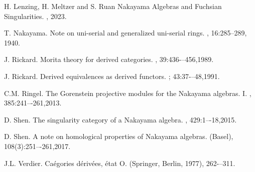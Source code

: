 \documentclass[a4paper, reqno]{amsart}
\theoremstyle{definition}
\theoremstyle{remark}
\numberwithin{equation}{section}
\begin{document}
\begin{thebibliography}{1}
H. Lenzing, H. Meltzer and S. Ruan
\newblock Nakayama Algebras and Fuchsian Singularities.
, 2023.

T. Nakayama.
\newblock Note on uni-serial and generalized uni-serial rings.
, 16:285--289, 1940.

J. Rickard.
\newblock Morita theory for derived categories.
, 39:436-–456,1989.

J. Rickard.
\newblock Derived equivalences as derived functors. ; 43:37-–48,1991.

C.M. Ringel.
\newblock The Gorenstein projective modules for the Nakayama algebras. I.
, 385:241–-261,2013.

D. Shen.
\newblock The singularity category of a Nakayama algebra.
, 429:1–-18,2015.

D. Shen.
\newblock A note on homological properties of Nakayama algebras.
 (Basel), 108(3):251–-261,2017.

J.L. Verdier.
\newblock Ca\'{e}gories d\'{e}riv\'{e}es, \'{e}tat O.
 (Springer, Berlin, 1977), 262-–311.

\end{thebibliography}
\end{document}
